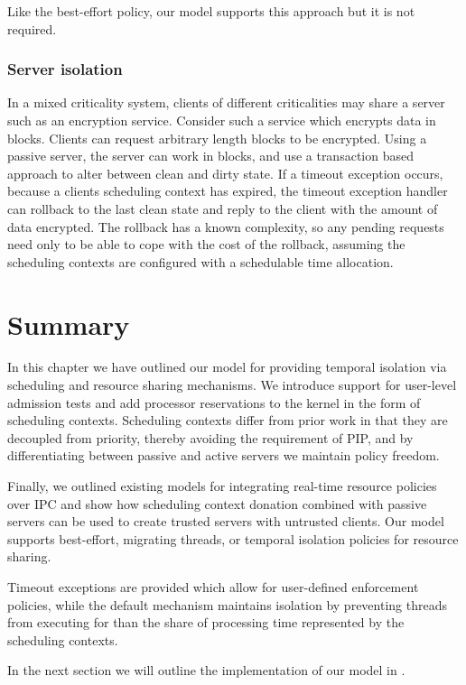 Like the best-effort policy, our model supports this approach but it is not required.

\subsubsection{Server isolation}

In a mixed criticality system, clients of different criticalities may share a server such as an
encryption service. Consider such a service which encrypts data in blocks. Clients can request
arbitrary length blocks to be encrypted. Using a passive server, the server can work in blocks, and
use a transaction based approach to alter between clean and dirty state. If a timeout exception
occurs, because a clients scheduling context has expired, the timeout exception handler can rollback
to the last clean state and reply to the client with the amount of data encrypted. The rollback has
a known complexity, so any pending requests need only to be able to cope with the cost of the
rollback, assuming the scheduling contexts are configured with a schedulable time allocation.


\section{Summary}

In this chapter we have outlined our model for providing temporal isolation via scheduling and
resource sharing mechanisms. We introduce support for user-level
admission tests and add processor reservations to the kernel in the form of scheduling contexts.  
Scheduling contexts differ from prior work in that they are decoupled from priority, thereby
avoiding the requirement of \gls{PIP}, and by differentiating between passive and active servers we
maintain policy freedom.

Finally, we outlined existing models for integrating real-time resource policies over \gls{IPC} and
show how scheduling context donation combined with passive servers can be used to create trusted
servers with untrusted clients. 
Our model supports best-effort, migrating threads, or temporal isolation policies for resource sharing.

Timeout exceptions are provided which allow for user-defined enforcement policies, while the default
mechanism maintains isolation by preventing threads from executing for than the share of processing
time represented by the scheduling contexts.

In the next section we will outline the implementation of our model in \selfour. 
